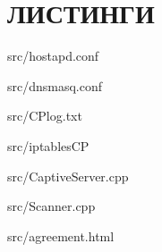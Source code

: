 \chapter{ЛИСТИНГИ}



{src/hostapd.conf}


{src/dnsmasq.conf}


{src/CPlog.txt}


{src/iptablesCP}



{src/CaptiveServer.cpp}


{src/Scanner.cpp}


{src/agreement.html}


% 

